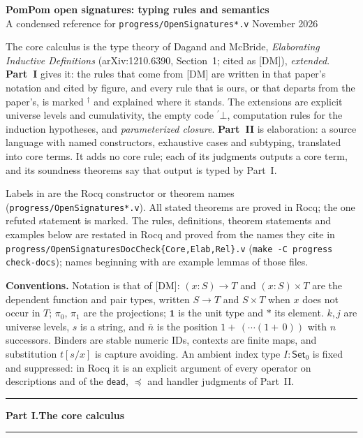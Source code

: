 \documentclass[10pt,a4paper]{article}
\newcommand{\Set}{\mathsf{Set}}
\newcommand{\op}[1]{\mathsf{#1}}
\newcommand{\one}{\mathbf{1}}
\newcommand{\unit}{\ast}
\newcommand{\code}[1]{{}^{\prime}\!#1}
\newcommand{\rn}[1]{{\normalfont\ttfamily\footnotesize\detokenize{#1}}}
\newcommand{\pos}[1]{\overline{#1}}
\newcommand{\suc}[1]{1{+}\,#1}
\newcommand{\pz}{\pi_0}
\newcommand{\dg}{^{\dagger}}
\newcommand{\DM}{[DM]}
\newcommand{\Part}[2]{\par\bigskip\hrule\smallskip
 {\Large\bfseries Part #1.\quad #2}\par\smallskip\hrule\medskip}
\begin{document}
\begin{center}
{\Large\bfseries PomPom open signatures: typing rules and semantics}\\[3pt]
{\small A condensed reference for \texttt{progress/OpenSignatures*.v}
\quad\textbullet{} November 2026}
\end{center}

The core calculus is the type theory of Dagand and McBride,
\emph{Elaborating Inductive Definitions} (arXiv:1210.6390, Section~1; cited
as \DM), \emph{extended}. \textbf{Part~I} gives it: the rules that come from
\DM{} are written in that paper's notation and cited by figure, and every
rule that is ours, or that departs from the paper's, is marked $\dg$ and
explained where it stands. The extensions are explicit universe levels and
cumulativity, the empty code $\code{\bot}$, computation rules for the
induction hypotheses, and \emph{parameterized closure}.
\textbf{Part~II} is elaboration: a source language with named constructors,
exhaustive cases and subtyping, translated into core terms. It adds no core
rule; each of its judgments outputs a core term, and its soundness theorems
say that output is typed by Part~I.

Labels in \rn{typewriter} are the Rocq constructor or theorem names
(\texttt{progress/OpenSignatures*.v}). All stated theorems are proved in
Rocq; the one refuted statement is marked. The rules, definitions, theorem
statements and examples below are restated in Rocq and proved from the names
they cite in \texttt{progress/OpenSignaturesDocCheck\{Core,Elab,Rel\}.v}
(\texttt{make -C progress check-docs}); names beginning with \rn{ex_} are
example lemmas of those files.

\textbf{Conventions.} Notation is that of \DM: $(x{:}S)\to T$ and
$(x{:}S)\times T$ are the dependent function and pair types, written $S\to T$
and $S\times T$ when $x$ does not occur in $T$; $\pz$, $\pi_1$ are the
projections; $\one$ is the unit type and $\unit$ its element. $k,j$ are
universe levels, $s$ is a string, and $\pos{n}$ is the position
$\suc{(\cdots(\suc{0}))}$ with $n$ successors. Binders are stable numeric
IDs, contexts are finite maps, and substitution $t[s/x]$ is capture
avoiding. An ambient index type $I:\Set_0$ is fixed and suppressed: in Rocq
it is an explicit argument of every operator on descriptions and of the
$\op{dead}$, $\preceq$ and handler judgments of Part~II.


\Part{I}{The core calculus}
\end{document}
